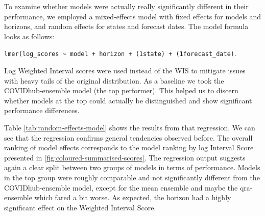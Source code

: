 \documentclass[
]{book}
\begin{document}
To examine whether models were actually really significantly different in their performance, we employed a mixed-effects model with fixed effects for models and horizons, and random effects for states and forecast dates. The model formula looks as follows:

\texttt{lmer(log\_scores\ \textasciitilde{}\ model\ +\ horizon\ +\ (1\textbar{}state)\ +\ (1\textbar{}forecast\_date)}.

Log Weighted Interval scores were used instead of the WIS to mitigate issues with heavy tails of the original distribution. As a baseline we took the COVIDhub-ensemble model (the top performer). This helped us to discern whether models at the top could actually be distinguished and show significant performance differences.

Table \ref{tab:random-effects-model} shows the results from that regression. We can see that the regression confirms general tendencies observed before. The overall ranking of model effects corresponds to the model ranking by log Interval Score presented in \ref{fig:coloured-summarised-scores}. The regression output suggests again a clear split between two groups of models in terms of performance. Models in the top group were roughly comparable and not significantly different from the COVIDhub-ensemble model, except for the mean ensemble and maybe the qra-ensemble which fared a bit worse. As expected, the horizon had a highly significant effect on the Weighted Interval Score.
\end{document}
